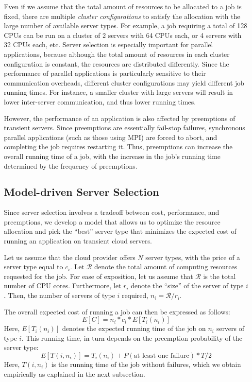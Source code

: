 Even if we assume that the total amount of resources to be allocated to a job is fixed, there are multiple \emph{cluster configurations} to satisfy the allocation with the large number of available server types. 
For example, a job requiring a total of 128 CPUs can be run on a cluster of 2 servers with 64 CPUs each, or 4 servers with 32 CPUs each, etc. 
Server selection is especially important for parallel applications, because although the total amount of resources in each cluster configuration is constant, the resources are distributed differently. 
Since the performance of parallel applications is particularly sensitive to their communication overheads, different cluster configurations may yield different job running times.
For instance, a smaller cluster with large servers will result in lower inter-server communication, and thus lower running times. 

However, the performance of an application is also affected by preemptions of transient servers.
Since preemptions are essentially fail-stop failures, synchronous parallel applications (such as those using MPI) are forced to abort, and completing the job requires restarting it.
Thus, preemptions can increase the overall running time of a job, with the increase in the job's running time determined by the frequency of preemptions.





\subsection{Model-driven Server Selection}

Since server selection involves a tradeoff between cost, performance, and preemptions, we develop a model that allows us to optimize the resource allocation and pick the ``best'' server type that minimizes the expected cost of running an application on transient cloud servers. 


Let us assume that the cloud provider offers $N$ server types, with the price of a server type equal to $c_i$. 
Let $\mathcal{R}$ denote the total amount of computing resources requested for the job. For ease of exposition, let us assume that $\mathcal{R}$ is the total number of CPU cores.
Furthermore, let $r_i$ denote the ``size'' of the server of type $i$.
Then, the number of servers of type $i$ required, $n_i = \mathcal{R}/r_i$. 

The overall expected cost of running a job can then be expressed as follows:
\begin{equation}
  \label{eq:e-cost}
  E[C] = n_i*c_i * E[T_i(n_i)]
\end{equation}
Here, $E[T_i(n_i)]$ denotes the expected running time of the job on $n_i$ servers of type $i$.
This running time, in turn depends on the preemption probability of the server type:
\begin{equation}
  \label{eq:et1}
E[T(i, n_i)] = T_i(n_i) + P(\text{at least one failure})*T/2   
\end{equation}
Here, $T(i, n_i)$ is the running time of the job without failures, which we obtain empirically as explained in the next subsection.

